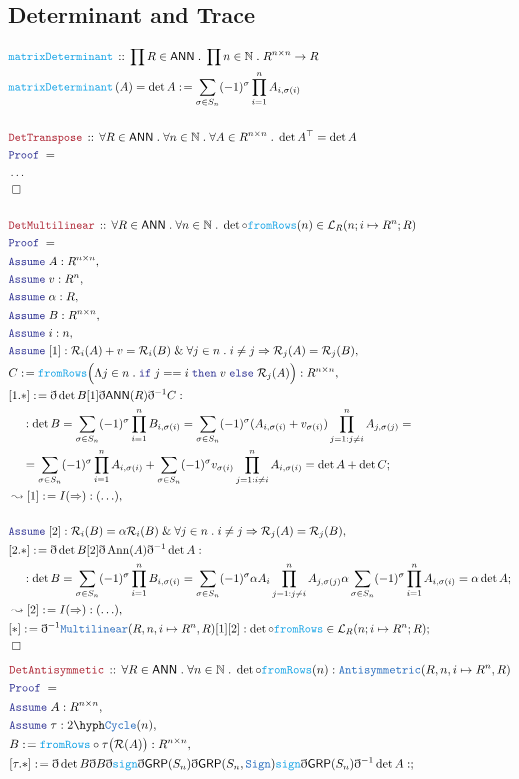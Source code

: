 \documentclass[12pt]{scrartcl}
\newcommand{\TYPE}[1]{\textcolor{NavyBlue}{\mathtt{#1}}}
\newcommand{\FUNC}[1]{\textcolor{Cerulean}{\mathtt{#1}}}
\newcommand{\LOGIC}[1]{\textcolor{Blue}{\mathtt{#1}}}
\newcommand{\THM}[1]{\textcolor{Maroon}{\mathtt{#1}}}
\renewcommand{\.}{\; . \;}
\newcommand{\de}{: \kern 0.1pc =}
\newcommand{\If}{\LOGIC{if} \;}
\newcommand{\Then}{ \; \LOGIC{then} \;}
\newcommand{\Else}{\; \LOGIC{else} \;}
\newcommand{\Act}[1]{\left(#1\right)}
\newcommand{\Theorem}[2]{& \THM{#1} \, :: \, #2 \\ & \Proof = \\ }
\newcommand{\DeclareFunc}[2]{& \FUNC{#1} \, :: \, #2 \\}
\newcommand{\DefineNamedFunc}[4]{&  \FUNC{#1}\Act{#2} = #3 \de #4 \\}
\newcommand{\NewLine}{\\ & \kern 1pc}
\newcommand{\Page}[1]{ \begin{align*} #1 \end{align*}   }
\newcommand{ \bd }{ \ByDef }
\newcommand{\NoProof}{ & \ldots \\ \EndProof}
\renewcommand{\And}{\; \& \;}
\newcommand{\Nat}{\mathbb{N} }
\newcommand{\Say}[3]{& #1 \de #2 : #3, \\}
\newcommand{\Conclude}[3]{& #1 \de #2 : #3; \\}
\newcommand{\Derive}[3]{& \leadsto #1 \de #2 : #3, \\}
\newcommand{\Assume}[2]{& \LOGIC{Assume} \; #1 : #2, \\}
\newcommand{\QED}{\; \square}
\newcommand{\EndProof}{& \QED \\}
\newcommand{\ByDef}{\eth}
\newcommand{\Proof}{\LOGIC{Proof} \; }
\newcommand{\R}{\mathcal{R}}
\newcommand{\GRP}{\mathsf{GRP}}
\DeclareMathOperator{\Ann}{Ann}
\newcommand{\ANN}{\mathsf{ANN}}
\begin{document}
\subsection{Determinant and Trace}
\Page{
	\DeclareFunc{matrixDeterminant}{\prod R \in \ANN \. \prod n \in \Nat \. R^{n \times n} \to R}
	\DefineNamedFunc{matrixDeterminant}{A}{\det A}{ \sum_{\sigma \in S_n} (-1)^\sigma\prod^n_{i=1} A_{i,\sigma(i)}}
	\\
	\Theorem{DetTranspose}{
		\forall R \in \ANN \. 
		\forall n \in \Nat \. 
		\forall A \in R^{n \times n} \. 
		\det A^\top = \det A
	}
	\NoProof 
	\\
	\Theorem{DetMultilinear}{  
		\forall R \in \ANN \.
		\forall n \in \Nat \. 
		\det \circ \FUNC{fromRows}(n) \in \mathcal{L}_R(n ; i \mapsto R^n; R)
	}
	\Assume{A}{R^{n \times n}}
	\Assume{v}{R^n}
	\Assume{\alpha}{R}
	\Assume{B}{R^{n \times n}}
	\Assume{i}{n}
	\Assume{[1]}{ \R_i(A) + v = \R_i(B) \And\forall j \in n \. i \neq j \Rightarrow \R_j(A) = \R_j(B)}
	\Say{C}{\FUNC{fromRows}\Big(\Lambda j \in n \. \If j == i \Then v \Else \R_j(A)\Big)}{R^{n\times n}}
	\Conclude{[1.*]}{\bd \det B[1]\bd \ANN(R) \bd^{-1}C}{ 
		\NewLine :
		\det B = 
		\sum_{\sigma \in S_n} (-1)^{\sigma} \prod^n_{i=1} B_{i,\sigma(i)} =
		\sum_{\sigma \in S_n} (-1)^{\sigma} (A_{i,\sigma(i)} + v_{\sigma(i)})\prod^n_{j=1:j\neq i} A_{j,\sigma(j)} = \NewLine =
		\sum_{\sigma \in S_n} (-1)^\sigma\prod^n_{i=1} A_{i,\sigma(i)}  +
		\sum_{\sigma \in S_n} (-1)^\sigma v_{\sigma(i)}\prod^n_{j=1:i\neq i} A_{i,\sigma(i)}  = 
		\det A + \det C
	}
	\Derive{[1]}{I(\Rightarrow)}{(\ldots) }
\\
	\Assume{[2]}{\R_i(B) = \alpha \R_i(B)\And \forall j \in n \. i \neq j \Rightarrow \R_j(A) = \R_j(B)}
	\Conclude{[2.*]}{  \bd \det  B[2] \bd \Ann(A) \bd^{-1} \det A}
	{
		\NewLine :
		\det B =
		\sum_{\sigma \in S_n} (-1)^{\sigma} \prod^n_{i=1} B_{i,\sigma(i)} =
                \sum_{\sigma \in S_n} (-1)^{\sigma} \alpha A_i \prod^n_{j=1:j\neq i} A_{j,\sigma(j)}
		\alpha \sum_{\sigma \in S_n} (-1)^{\sigma}  \prod^n_{i=1} A_{i,\sigma(i)} =
		\alpha \det A
	}
	\Derive{[2]}{I(\Rightarrow)}{(\ldots)}
	\Conclude{[*]}{\bd^{-1}\TYPE{Multilinear}(R,n,i \mapsto R^n,R)[1][2]}
	{ \det \circ \FUNC{fromRows} \in \mathcal{L}_R(n;i \mapsto R^n;R) }
	\EndProof
}\Page{
	\Theorem{DetAntisymmetic}{
		\forall R \in \ANN \.
		\forall n \in \Nat \.
		\det \circ \FUNC{fromRows}(n) : \TYPE{Antisymmetric}(R,n, i \mapsto R^n, R)
	}
	\Assume{A}{R^{n \times n}}
	\Assume{\tau}{2\hyph\TYPE{Cycle}(n)}
	\Say{B}{\FUNC{fromRows} \circ \tau\big( \R(A)\big)}{R^{n \times n}}
	\Conclude{[\tau.*]}{\bd \det B \bd B \bd \FUNC{sign}\bd \GRP(S_n)\bd \GRP(S_n,\TYPE{Sign})\FUNC{sign}\bd \GRP(S_n)\bd^{-1}\det A}{
}}
\end{document}
